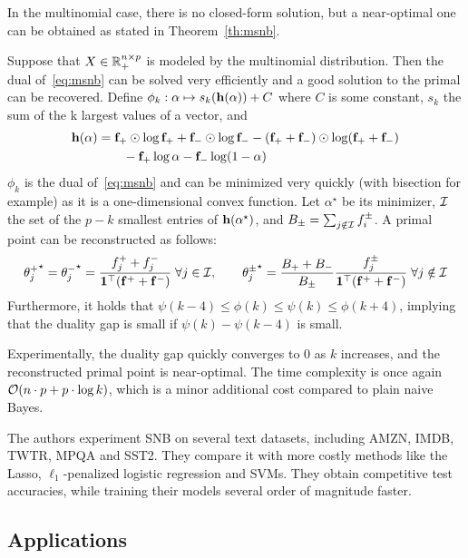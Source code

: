 In the multinomial case, there is no closed-form solution, but a near-optimal one can be obtained as
stated in Theorem~\ref{th:msnb}.
\begin{theorem}\label{th:msnb}
Suppose that $X \in \mathbb{R}_+^{n \times p}$ is modeled by the multinomial distribution.
Then the dual of~\ref{eq:msnb} can be solved very efficiently and a good solution to the primal can be recovered.
Define $\phi_k : \alpha \mapsto s_k(\mathbf{h}(\alpha)) + C$ where $C$ is some constant,
$s_k$ the sum of the k largest values of a vector, and
\begin{equation*}
    \begin{split}
        \mathbf{h}(\alpha) &= \mathbf{f}_+ \odot \log \mathbf{f}_+ + \mathbf{f}_- \odot \log \mathbf{f}_-
        - (\mathbf{f}_+ + \mathbf{f}_-) \odot \log (\mathbf{f}_+ + \mathbf{f}_-)\\
        &\qquad - \mathbf{f}_+ \log \alpha - \mathbf{f}_- \log (1 - \alpha)
    \end{split}
\end{equation*}
$\phi_k$ is the dual of~\ref{eq:msnb} and can be minimized very quickly (with bisection for example)
as it is a one-dimensional convex function.
Let $\alpha^\star$ be its minimizer, $\mathcal{I}$ the set of the $p - k$ smallest entries of
$\mathbf{h}(\alpha^\star)$, and $B_\pm = \sum_{j \notin \mathcal{I}} f_i^\pm$.
A primal point can be reconstructed as follows:
\begin{equation*}
{\theta^+_j}^\star = {\theta^-_j}^\star = \frac{f_j^+ + f_j^-}{\mathbf{1}^\top(\mathbf{f}^+ + \mathbf{f}^-)}
\;\forall j \in \mathcal{I}
,\qquad
{\theta^\pm_j}^\star = \frac{B_+ + B_-}{B_\pm}\frac{f^\pm_j}{\mathbf{1}^\top(\mathbf{f}^+ + \mathbf{f}^-)}
\;\forall j \notin \mathcal{I}
\end{equation*}
Furthermore, it holds that $\psi(k - 4) \leq \phi(k) \leq \psi(k) \leq \phi(k + 4)$,
implying that the duality gap is small if $\psi(k) - \psi(k - 4)$ is small.
\end{theorem}
Experimentally, the duality gap quickly converges to $0$ as $k$ increases,
and the reconstructed primal point is near-optimal.
The time complexity is once again $\mathcal{O}(n \cdot p + p \cdot \log k)$,
which is a minor additional cost compared to plain naive Bayes.

The authors experiment SNB on several text datasets,
including AMZN, IMDB, TWTR, MPQA and SST2.
They compare it with more costly methods like the Lasso, $\ell_1$-penalized logistic regression and SVMs.
They obtain competitive test accuracies, while training their models several order of magnitude faster.

\subsection{Applications}\label{subsec:nb_app}

